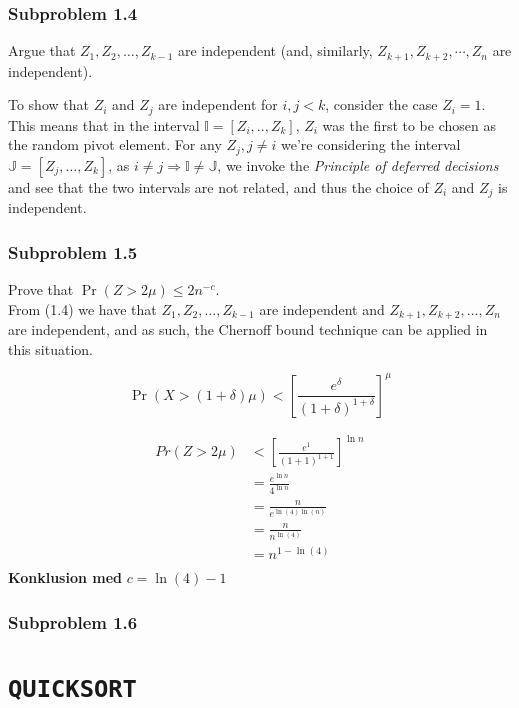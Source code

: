 \documentclass[article,a4paper,oneside]{memoir}
\newcommand{\+}[1]{\ensuremath{\boldsymbol{#1}}}
\begin{document}
\subsection{Subproblem 1.4}
Argue that $Z_1, Z_2, \ldots, Z_{k-1}$ are independent (and, similarly, $Z_{k+1}, Z_{k+2}, \cdots, Z_n$ are independent).
\par
To show that $Z_i$ and $Z_j$ are independent for $i,j < k$, consider the case $Z_i = 1$. This means that in the interval $\mathbb{I} = [Z_i,..,Z_k]$, $Z_i$ was the first to be chosen as the random pivot element.
For any $Z_j, j \neq i$ we're considering the interval $\mathbb{J} = [Z_j,\ldots, Z_k]$, as $i \neq j \Rightarrow \mathbb{I} \neq \mathbb{J}$, we invoke the \emph{Principle of deferred decisions} and see that the two intervals are not related, and thus the choice of $Z_i$ and $Z_j$ is independent.
\subsection{Subproblem 1.5}
Prove that $\Pr (Z > 2\mu)\leq 2n^{-c}$.
\\
From (1.4) we have that $Z_1, Z_2, \ldots, Z_{k-1}$ are independent and $Z_{k+1}, Z_{k+2}, \ldots, Z_n$ are independent, and as such, the Chernoff bound technique can be applied in this situation.

$$\Pr \left( X > (1+\delta)\mu \right) < \left[ \frac{e^\delta}{(1+\delta)^{1+\delta}} \right]^\mu$$

\begin{align*}
  Pr( Z > 2\mu) & <  \left[ \frac{e^1}{(1+1)^{1+1}} \right] ^{\ln n} \\
  &= \frac{e^{\ln n}}{4^{\ln n}}\\ 
  &= \frac {n}{e^{\ln(4)\ln(n)}} \\
  &= \frac{n}{n^{\ln(4)}}\\
  &= n^{1-\ln (4)}\\
\end{align*}
\textbf{Konklusion med } $ c=\ln(4)-1$



\subsection{Subproblem 1.6}


\chapter{\texttt{QUICKSORT}}
\end{document}
